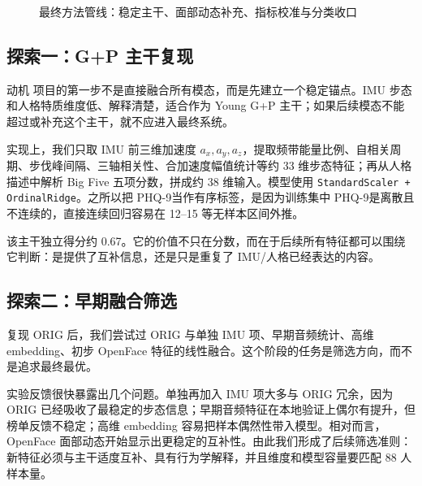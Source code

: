 \documentclass[UTF8,zihao=-4,fontset=windows]{ctexart}
\newcommand{\code}[1]{\texttt{#1}}
\newcommand{\phq}{PHQ-9}
\newcommand{\tightcaption}[1]{\caption{#1}\vspace{-0.4em}}
\begin{document}
\begin{figure}[H]
{}
  \tightcaption{最终方法管线：稳定主干、面部动态补充、指标校准与分类收口}
  \label{fig:method-pipeline}
\end{figure}

\subsection{探索一：G+P 主干复现}

\begin{methodbox}{动机}
项目的第一步不是直接融合所有模态，而是先建立一个稳定锚点。IMU 步态和人格特质维度低、解释清楚，适合作为 Young G+P 主干；如果后续模态不能超过或补充这个主干，就不应进入最终系统。
\end{methodbox}

实现上，我们只取 IMU 前三维加速度 $a_x,a_y,a_z$，提取频带能量比例、自相关周期、步伐峰间隔、三轴相关性、合加速度幅值统计等约 33 维步态特征；再从人格描述中解析 Big Five 五项分数，拼成约 38 维输入。模型使用 \code{StandardScaler + OrdinalRidge}。之所以把 \phq 当作有序标签，是因为训练集中 \phq 是离散且不连续的，直接连续回归容易在 12--15 等无样本区间外推。

该主干独立得分约 0.67。它的价值不只在分数，而在于后续所有特征都可以围绕它判断：是提供了互补信息，还是只是重复了 IMU/人格已经表达的内容。

\subsection{探索二：早期融合筛选}

复现 ORIG 后，我们尝试过 ORIG 与单独 IMU 项、早期音频统计、高维 embedding、初步 OpenFace 特征的线性融合。这个阶段的任务是筛选方向，而不是追求最终最优。

实验反馈很快暴露出几个问题。单独再加入 IMU 项大多与 ORIG 冗余，因为 ORIG 已经吸收了最稳定的步态信息；早期音频特征在本地验证上偶尔有提升，但榜单反馈不稳定；高维 embedding 容易把样本偶然性带入模型。相对而言，OpenFace 面部动态开始显示出更稳定的互补性。由此我们形成了后续筛选准则：新特征必须与主干适度互补、具有行为学解释，并且维度和模型容量要匹配 88 人样本量。
\end{document}
